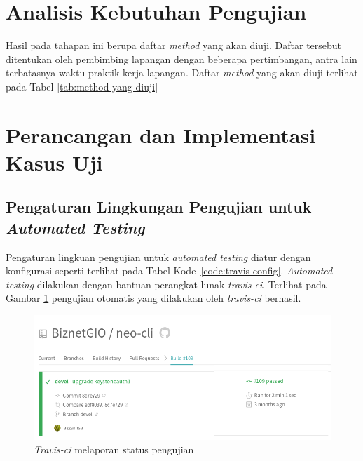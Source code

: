

\section{Analisis Kebutuhan Pengujian}

Hasil pada tahapan ini berupa daftar \emph{method} yang akan
diuji. Daftar tersebut ditentukan oleh pembimbing lapangan dengan
beberapa pertimbangan, antra lain terbatasnya waktu praktik kerja
lapangan. Daftar \emph{method} yang akan diuji terlihat pada Tabel
\ref{tab:method-yang-diuji}



\section{Perancangan dan Implementasi Kasus Uji}



\subsection{Pengaturan Lingkungan Pengujian untuk \emph{Automated Testing}}

Pengaturan lingkuan pengujian untuk \emph{automated testing} diatur
dengan konfigurasi seperti terlihat pada Tabel
Kode~\ref{code:travis-config}. \emph{Automated testing} dilakukan
dengan bantuan perangkat lunak \emph{travis-ci}. Terlihat pada Gambar
\ref{fig:travis-head2} pengujian otomatis yang dilakukan oleh \emph{travis-ci} berhasil.

\begin{code}
  \label{code:travis-config}
\end{code}

\begin{figure}[H]
  \centering
  \includegraphics[width=.8\linewidth]{img/travis-head}
  \caption{\emph{Travis-ci} melaporan status pengujian}
  \label{fig:travis-head2}
\end{figure}

